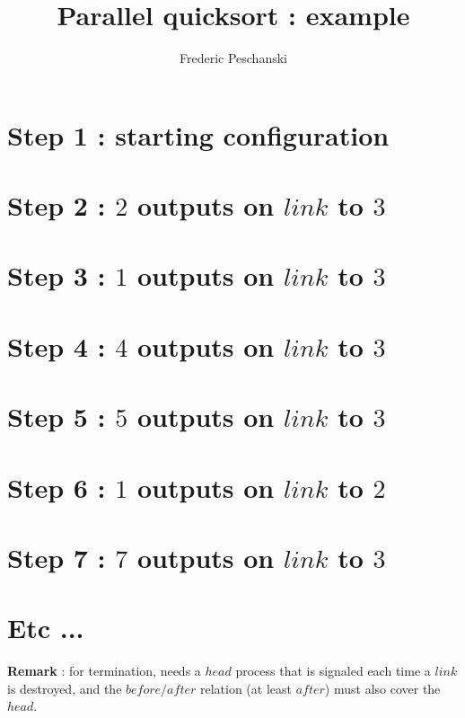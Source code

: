 \documentclass{article}
\begin{document}
  \title{Parallel quicksort : example}
  \author{Frederic Peschanski}

  \maketitle

\section*{Step 1 : starting configuration}



\section*{Step 2 : $2$ outputs on $link$  to $3$}



\section*{Step 3 : $1$ outputs on $link$  to $3$}



\section*{Step 4 : $4$ outputs on $link$  to $3$}



\section*{Step 5 : $5$ outputs on $link$  to $3$}



\section*{Step 6 : $1$ outputs on $link$  to $2$}



\section*{Step 7 : $7$ outputs on $link$  to $3$}



\section*{Etc ...}

\textbf{Remark} :  for termination, needs a $head$ process
 that is signaled each time a $link$ is destroyed, and the
 $before/after$ relation  (at least $after$) must also cover
 the $head$.
\end{document}

